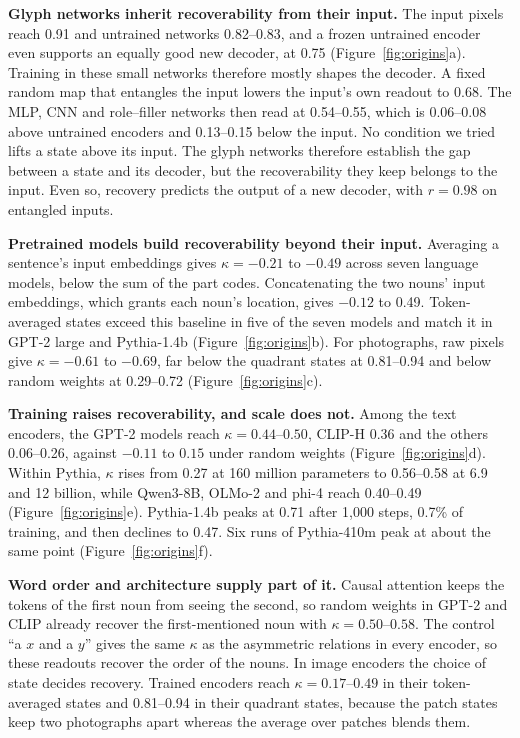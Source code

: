 \documentclass[10pt]{article}
\theoremstyle{plain}
\theoremstyle{remark}
\begin{document}
\textbf{Glyph networks inherit recoverability from their input.} The input pixels reach 0.91 and untrained networks 0.82--0.83, and a frozen untrained encoder even supports an equally good new decoder, at 0.75 (Figure~\ref{fig:origins}a). Training in these small networks therefore mostly shapes the decoder. A fixed random map that entangles the input lowers the input's own readout to 0.68. The MLP, CNN and role--filler networks then read at 0.54--0.55, which is 0.06--0.08 above untrained encoders and 0.13--0.15 below the input. No condition we tried lifts a state above its input. The glyph networks therefore establish the gap between a state and its decoder, but the recoverability they keep belongs to the input. Even so, recovery predicts the output of a new decoder, with $r = 0.98$ on entangled inputs.

\textbf{Pretrained models build recoverability beyond their input.} Averaging a sentence's input embeddings gives $\kappa = -0.21$ to $-0.49$ across seven language models, below the sum of the part codes. Concatenating the two nouns' input embeddings, which grants each noun's location, gives $-0.12$ to 0.49. Token-averaged states exceed this baseline in five of the seven models and match it in GPT-2 large and Pythia-1.4b (Figure~\ref{fig:origins}b). For photographs, raw pixels give $\kappa = -0.61$ to $-0.69$, far below the quadrant states at 0.81--0.94 and below random weights at 0.29--0.72 (Figure~\ref{fig:origins}c).

\textbf{Training raises recoverability, and scale does not.} Among the text encoders, the GPT-2 models reach $\kappa = 0.44$--$0.50$, CLIP-H 0.36 and the others 0.06--0.26, against $-0.11$ to $0.15$ under random weights (Figure~\ref{fig:origins}d). Within Pythia, $\kappa$ rises from 0.27 at 160 million parameters to 0.56--0.58 at 6.9 and 12 billion, while Qwen3-8B, OLMo-2 and phi-4 reach 0.40--0.49 (Figure~\ref{fig:origins}e). Pythia-1.4b peaks at 0.71 after 1{,}000 steps, 0.7\% of training, and then declines to 0.47. Six runs of Pythia-410m peak at about the same point (Figure~\ref{fig:origins}f).

\textbf{Word order and architecture supply part of it.} Causal attention keeps the tokens of the first noun from seeing the second, so random weights in GPT-2 and CLIP already recover the first-mentioned noun with $\kappa = 0.50$--$0.58$. The control ``a $x$ and a $y$'' gives the same $\kappa$ as the asymmetric relations in every encoder, so these readouts recover the order of the nouns. In image encoders the choice of state decides recovery. Trained encoders reach $\kappa = 0.17$--$0.49$ in their token-averaged states and 0.81--0.94 in their quadrant states, because the patch states keep two photographs apart whereas the average over patches blends them.
\end{document}

